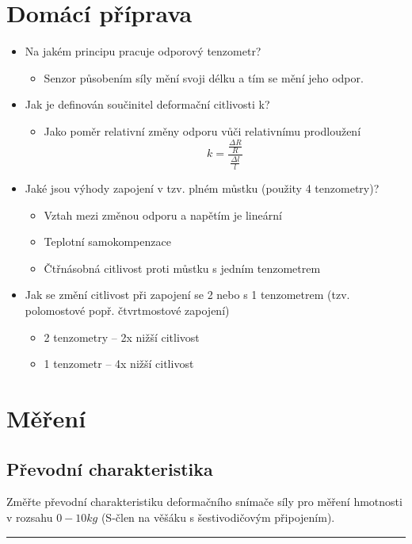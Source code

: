 \documentclass[a4paper,12pt]{article}
\begin{document}
\section{Domácí příprava}
\begin{itemize}
  \item Na jakém principu pracuje odporový tenzometr? 
    \begin{itemize}
      \item Senzor působením síly mění svoji délku a tím se mění jeho odpor.
    \end{itemize}
  \item Jak je definován součinitel deformační citlivosti k?
    \begin{itemize}
      \item Jako poměr relativní změny odporu vůči relativnímu prodloužení
      $$
       k = \frac{\frac{\Delta R}{R}}{\frac{\Delta l}{l}}
      $$
    \end{itemize}
  \item Jaké jsou výhody zapojení v tzv. plném můstku (použity 4 tenzometry)?
    \begin{itemize}
      \item Vztah mezi změnou odporu a napětím je lineární
      \item Teplotní samokompenzace
      \item Čtřnásobná citlivost proti můstku s jedním tenzometrem
    \end{itemize}
  \item Jak se změní citlivost při zapojení se 2 nebo s 1 tenzometrem (tzv. polomostové popř. čtvrtmostové zapojení)
    \begin{itemize}
      \item 2 tenzometry -- 2x nižší citlivost
      \item 1 tenzometr -- 4x nižší citlivost
    \end{itemize}
\end{itemize}

\newpage
\section{Měření}
\subsection{Převodní charakteristika}
Změřte převodní charakteristiku deformačního snímače síly pro měření hmotnosti v rozsahu $0-10 kg$ (S-člen na věšáku s šestivodičovým připojením).
\par\noindent\rule{\textwidth}{0.4pt}
\end{document}
